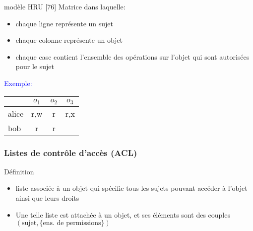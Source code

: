\begin{reveals}
\begin{frame}
  \vfill

   \begin{block}{modèle HRU [76]}
     Matrice dans laquelle:
     \begin{itemize}
     \item chaque ligne représente un sujet
     \item chaque colonne représente un objet
     \item chaque case contient l'ensemble des opérations sur l'objet
       qui sont autorisées pour le sujet
     \end{itemize}
  \end{block}

  \vfill

  \begin{center}
    \textcolor{blue}{Exemple:}~~~\begin{tabular}[c]{|l|c|c|c|}
      \rowcolor{white}
      \hline &\(o_1\)&\(o_2\)&\(o_3\) \\\hline
        \rowcolor{white}
    alice & r,w & r & r,x \\\hline
      \rowcolor{white}
      bob & r & r &  \\\hline
    \end{tabular}
  \end{center}


  \vfill
\end{frame}


\begin{frame}
  \frametitle{Listes de contrôle d'accès (ACL)}

  \vfill

   \begin{block}{Définition}
     \begin{itemize}
     \item liste associée à un objet qui spécifie tous les sujets
       pouvant accéder à l'objet ainsi que leurs droits
     \item Une telle liste est attachée à un objet, et ses éléments sont des couples
       \((\text{sujet},\{\text{ens. de permissions}\})\)
     \end{itemize}
  \end{block}

  \vfill


\end{frame}
\end{reveals}
